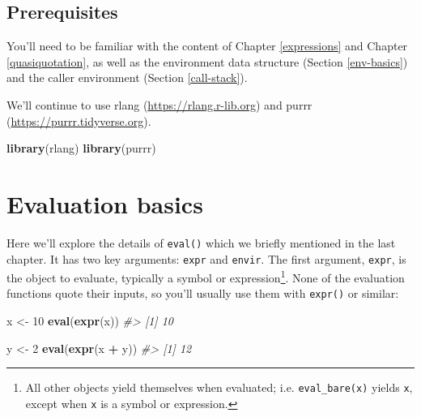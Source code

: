 \documentclass[]{book}
\makeatletter
\newenvironment{Shaded}{\begin{snugshade}}{\end{snugshade}}
\newcommand{\CommentTok}[1]{\textcolor[rgb]{0.37,0.37,0.37}{\textit{#1}}}
\newcommand{\DecValTok}[1]{\textcolor[rgb]{0.06,0.06,0.06}{#1}}
\newcommand{\KeywordTok}[1]{\textcolor[rgb]{0.27,0.27,0.27}{\textbf{#1}}}
\newcommand{\NormalTok}[1]{#1}
\newcommand{\OperatorTok}[1]{\textcolor[rgb]{0.43,0.43,0.43}{\textbf{#1}}}
\newcommand{\StringTok}[1]{\textcolor[rgb]{0.5,0.5,0.5}{#1}}
\let\rmarkdownfootnote\footnote%
\def\footnote{\protect\rmarkdownfootnote}
\newcommand{\indexc}[1]{\index{#1@\texttt{#1}}}
\renewcommand{\href}[2]{#2 (\url{#1})}
\makeatother
\begin{document}
\hypertarget{prerequisites-3}{%
\subsection*{Prerequisites}\label{prerequisites-3}}

You'll need to be familiar with the content of Chapter \ref{expressions} and Chapter \ref{quasiquotation}, as well as the environment data structure (Section \ref{env-basics}) and the caller environment (Section \ref{call-stack}).

We'll continue to use \href{https://rlang.r-lib.org}{rlang} and \href{https://purrr.tidyverse.org}{purrr}.

\begin{Shaded}
\begin{Highlighting}[]
\KeywordTok{library}\NormalTok{(rlang)}
\KeywordTok{library}\NormalTok{(purrr)}
\end{Highlighting}
\end{Shaded}

\hypertarget{eval}{%
\section{Evaluation basics}\label{eval}}

\indexc{eval\_bare()}

Here we'll explore the details of \texttt{eval()} which we briefly mentioned in the last chapter. It has two key arguments: \texttt{expr} and \texttt{envir}. The first argument, \texttt{expr}, is the object to evaluate, typically a symbol or expression\footnote{All other objects yield themselves when evaluated; i.e. \texttt{eval\_bare(x)} yields \texttt{x}, except when \texttt{x} is a symbol or expression.}. None of the evaluation functions quote their inputs, so you'll usually use them with \texttt{expr()} or similar:

\begin{Shaded}
\begin{Highlighting}[]
\NormalTok{x <-}\StringTok{ }\DecValTok{10}
\KeywordTok{eval}\NormalTok{(}\KeywordTok{expr}\NormalTok{(x))}
\CommentTok{#> [1] 10}

\NormalTok{y <-}\StringTok{ }\DecValTok{2}
\KeywordTok{eval}\NormalTok{(}\KeywordTok{expr}\NormalTok{(x }\OperatorTok{+}\StringTok{ }\NormalTok{y))}
\CommentTok{#> [1] 12}
\end{Highlighting}
\end{Shaded}
\end{document}
